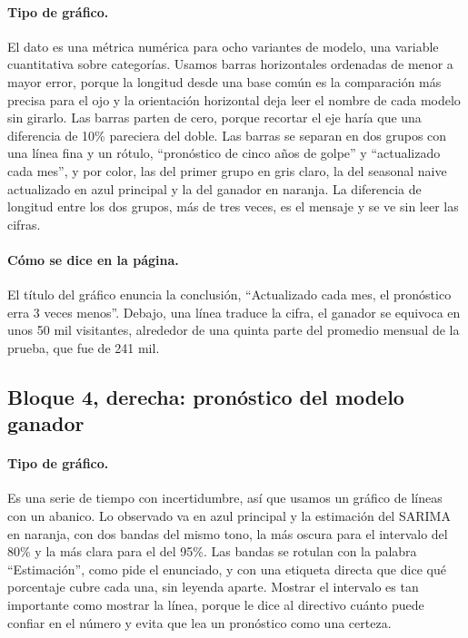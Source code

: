 \paragraph{Tipo de gráfico.} El dato es una métrica numérica para ocho variantes de modelo, una
variable cuantitativa sobre categorías. Usamos barras horizontales ordenadas de menor a mayor
error, porque la longitud desde una base común es la comparación más precisa para el ojo y la
orientación horizontal deja leer el nombre de cada modelo sin girarlo. Las barras parten de cero,
porque recortar el eje haría que una diferencia de 10\% pareciera del doble. Las barras se separan
en dos grupos con una línea fina y un rótulo, ``pronóstico de cinco años de golpe'' y
``actualizado cada mes'', y por color, las del primer grupo en gris claro, la del seasonal naive
actualizado en azul principal y la del ganador en naranja. La diferencia de longitud entre los
dos grupos, más de tres veces, es el mensaje y se ve sin leer las cifras.

\paragraph{Cómo se dice en la página.} El título del gráfico enuncia la conclusión, ``Actualizado
cada mes, el pronóstico erra 3 veces menos''. Debajo, una línea traduce la cifra, el ganador se
equivoca en unos 50 mil visitantes, alrededor de una quinta parte del promedio mensual de la
prueba, que fue de 241 mil.

\subsection{Bloque 4, derecha: pronóstico del modelo ganador}

\paragraph{Tipo de gráfico.} Es una serie de tiempo con incertidumbre, así que usamos un gráfico
de líneas con un abanico. Lo observado va en azul principal y la estimación del SARIMA en naranja,
con dos bandas del mismo tono, la más oscura para el intervalo del 80\% y la más clara para el del
95\%. Las bandas se rotulan con la palabra ``Estimación'', como pide el enunciado, y con una
etiqueta directa que dice qué porcentaje cubre cada una, sin leyenda aparte. Mostrar el intervalo
es tan importante como mostrar la línea, porque le dice al directivo cuánto puede confiar en el
número y evita que lea un pronóstico como una certeza.

